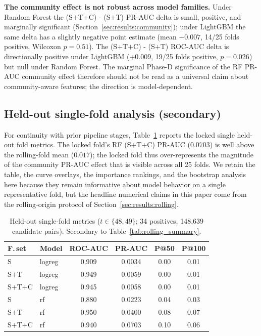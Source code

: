\documentclass[conference]{IEEEtran}
\begin{document}
\textbf{The community effect is not robust across model families.}
Under Random Forest the (S$+$T$+$C) - (S$+$T) PR-AUC delta is small,
positive, and marginally significant (Section~\ref{sec:results:community});
under LightGBM the same delta has a slightly negative point estimate
(mean $-0.007$, 14/25 folds positive, Wilcoxon $p = 0.51$). The
(S$+$T$+$C) - (S$+$T) ROC-AUC delta is directionally positive under
LightGBM ($+0.009$, 19/25 folds positive, $p = 0.026$) but null
under Random Forest. The marginal Phase-D significance of the RF
PR-AUC community effect therefore should not be read as a universal
claim about community-aware features; the direction is
model-dependent.

\subsection{Held-out single-fold analysis (secondary)}
\label{sec:results:locked}

For continuity with prior pipeline stages,
Table~\ref{tab:test_metrics} reports the locked single held-out fold
metrics. The locked fold's RF (S$+$T$+$C) PR-AUC ($0.0703$) is well
above the rolling-fold mean ($0.017$); the locked fold thus
over-represents the magnitude of the community PR-AUC effect that is
visible across all 25 folds. We retain the table, the curve
overlays, the importance rankings, and the bootstrap analysis here
because they remain informative about model behavior on a single
representative fold, but the headline numerical claims in this paper
come from the rolling-origin protocol of
Section~\ref{sec:results:rolling}.

\begin{table}[t]
\caption{Held-out single-fold metrics ($t \in \{48, 49\}$;
34 positives, 148{,}639 candidate pairs). Secondary to
Table~\ref{tab:rolling_summary}.}
\label{tab:test_metrics}
\centering
\begin{tabular}{llcccc}
\toprule
F.\,set & Model & ROC-AUC & PR-AUC & P@50 & P@100 \\
\midrule
S      & logreg & 0.909 & 0.0034 & 0.00 & 0.01 \\
S$+$T   & logreg & 0.949 & 0.0059 & 0.00 & 0.01 \\
S$+$T$+$C & logreg & 0.945 & 0.0058 & 0.00 & 0.01 \\
\addlinespace
S      & rf     & 0.880 & 0.0223 & 0.04 & 0.03 \\
S$+$T   & rf     & 0.950 & 0.0400 & 0.08 & 0.07 \\
S$+$T$+$C & rf     & 0.940 & 0.0703 & 0.10 & 0.06 \\
\bottomrule
\end{tabular}
\end{table}
\end{document}
